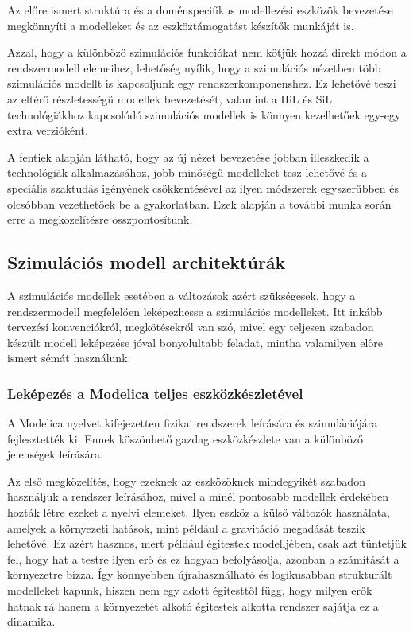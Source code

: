         Az előre ismert struktúra és a doménspecifikus modellezési eszközök bevezetése megkönnyíti a modelleket és az eszköztámogatást készítők munkáját is.

        Azzal, hogy a különböző szimulációs funkciókat nem kötjük hozzá direkt módon a rendszermodell elemeihez, lehetőség nyílik, hogy a szimulációs nézetben több szimulációs modellt is kapcsoljunk egy rendszerkomponenshez.
        Ez lehetővé teszi az eltérő részletességű modellek bevezetését, valamint a HiL és SiL technológiákhoz kapcsolódó szimulációs modellek is könnyen kezelhetőek egy-egy extra verzióként.

        A fentiek alapján látható, hogy az új nézet bevezetése jobban illeszkedik a technológiák alkalmazásához, jobb minőségű modelleket tesz lehetővé és a speciális szaktudás igényének csökkentésével az ilyen módszerek egyszerűbben és olcsóbban vezethetőek be a gyakorlatban.
        Ezek alapján a további munka során erre a megközelítésre összpontosítunk.

    \subsection{Szimulációs modell architektúrák}
    A szimulációs modellek esetében a változások azért szükségesek, hogy a rendszermodell megfelelően leképezhesse a szimulációs modelleket.
    Itt inkább tervezési konvenciókról, megkötésekről van szó, mivel egy teljesen szabadon készült modell leképezése jóval bonyolultabb feladat, mintha valamilyen előre ismert sémát használunk.

        \subsubsection{Leképezés a Modelica teljes eszközkészletével}
        A Modelica nyelvet kifejezetten fizikai rendszerek leírására és szimulációjára fejlesztették ki.
        Ennek köszönhető gazdag eszközkészlete van a különböző jelenségek leírására.
        
        Az első megközelítés, hogy ezeknek az eszközöknek mindegyikét szabadon használjuk a rendszer leírásához, mivel a minél pontosabb modellek érdekében hozták létre ezeket a nyelvi elemeket.
        Ilyen eszköz a külső változók használata, amelyek a környezeti hatások, mint például a gravitáció megadását teszik lehetővé. Ez azért hasznos, mert például égitestek modelljében, csak azt tüntetjük fel, hogy hat a testre ilyen erő és ez hogyan befolyásolja, azonban a számítását a környezetre bízza. Így könnyebben újrahasználható és logikusabban strukturált modelleket kapunk, hiszen nem egy adott égitesttől függ, hogy milyen erők hatnak rá hanem a környezetét alkotó égitestek alkotta rendszer sajátja ez a dinamika.
        
